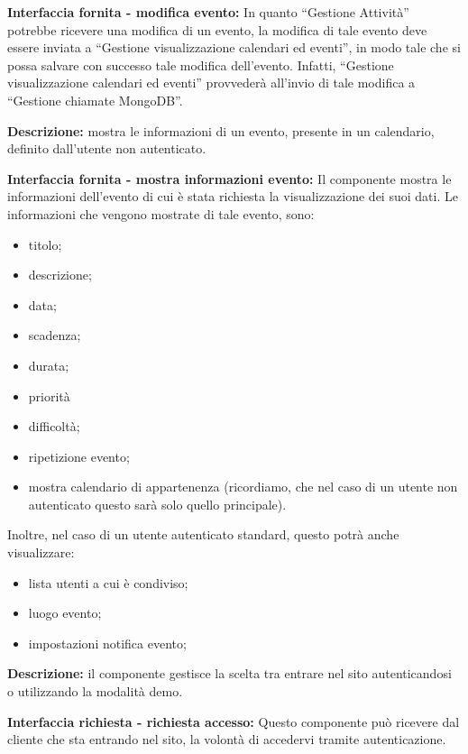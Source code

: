 \begin{listaPersonale}[]{}
    \textbf{Interfaccia fornita - modifica evento:} In quanto “Gestione Attività” potrebbe ricevere una modifica di un evento, la modifica di tale evento deve essere inviata a “Gestione visualizzazione calendari ed eventi”, in modo tale che si possa salvare con successo tale modifica dell'evento. Infatti, “Gestione visualizzazione calendari ed eventi” provvederà all'invio di tale modifica a “Gestione chiamate MongoDB”.



    \textbf{Descrizione:} mostra le informazioni di un evento, presente in un calendario, definito dall'utente non autenticato.

    \textbf{Interfaccia fornita - mostra informazioni evento:} Il componente mostra le informazioni dell'evento di cui è stata richiesta la visualizzazione dei suoi dati. Le informazioni che vengono mostrate di tale evento, sono:
    \begin{itemize}
        \item titolo;
        \item descrizione;
        \item data;
        \item scadenza;
        \item durata;
        \item priorità
        \item difficoltà;
        \item ripetizione evento;
        \item mostra calendario di appartenenza (ricordiamo, che nel caso di un utente non autenticato questo sarà solo quello principale).
    \end{itemize}
    Inoltre, nel caso di un utente autenticato standard, questo potrà anche visualizzare:
    \begin{itemize}
        \item lista utenti a cui è condiviso;
        \item luogo evento;
        \item impostazioni notifica evento;
    \end{itemize}



    \textbf{Descrizione:} il componente gestisce la scelta tra entrare nel sito autenticandosi o utilizzando la modalità demo.

    \textbf{Interfaccia richiesta - richiesta accesso:} Questo componente può ricevere dal cliente che sta entrando nel sito, la volontà di accedervi tramite autenticazione.


\end{listaPersonale}
